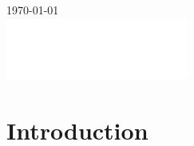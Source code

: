 \documentclass[11pt,a4paper]{article}
\begin{document}
\begin{titlepage}
{\large \today}\\[2cm] %

\vfill %
\includegraphics[width=60mm]{LiU_logo.PNG} %

\end{titlepage}

\pagecolor{none}
\color{black}
\begin{abstract}
    \lipsum[24]
\end{abstract}
\newpage

\tableofcontents

\newpage


\section{Introduction}
\end{document}
